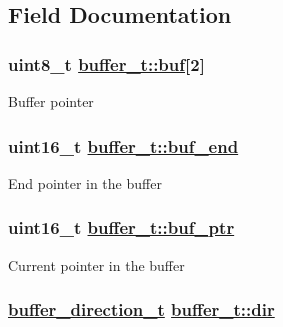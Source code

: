 \subsection{Field Documentation}
\hypertarget{structbuffer__t_ed0f8f327664a6eea8d419fd852a0b46}{
\subsubsection[buf]{\setlength{\rightskip}{0pt plus 5cm}uint8\_\-t \hyperlink{structbuffer__t_ed0f8f327664a6eea8d419fd852a0b46}{buffer\_\-t::buf}\mbox{[}2\mbox{]}}}
\label{structbuffer__t_ed0f8f327664a6eea8d419fd852a0b46}


Buffer pointer \hypertarget{structbuffer__t_93697fa152d62c9539dcd5b2f42b5d1d}{
\subsubsection[buf\_\-end]{\setlength{\rightskip}{0pt plus 5cm}uint16\_\-t \hyperlink{structbuffer__t_93697fa152d62c9539dcd5b2f42b5d1d}{buffer\_\-t::buf\_\-end}}}
\label{structbuffer__t_93697fa152d62c9539dcd5b2f42b5d1d}


End pointer in the buffer \hypertarget{structbuffer__t_435b821b8f73bc752e5ed8b0edec6a2d}{
\subsubsection[buf\_\-ptr]{\setlength{\rightskip}{0pt plus 5cm}uint16\_\-t \hyperlink{structbuffer__t_435b821b8f73bc752e5ed8b0edec6a2d}{buffer\_\-t::buf\_\-ptr}}}
\label{structbuffer__t_435b821b8f73bc752e5ed8b0edec6a2d}


Current pointer in the buffer \hypertarget{structbuffer__t_90c0669e859280525c9a16dc1d1a6153}{
\subsubsection[dir]{\setlength{\rightskip}{0pt plus 5cm}\hyperlink{buffer_8h_584321097d4e6c6a37198fbbb6d76c71}{buffer\_\-direction\_\-t} \hyperlink{structbuffer__t_90c0669e859280525c9a16dc1d1a6153}{buffer\_\-t::dir}}}
\label{structbuffer__t_90c0669e859280525c9a16dc1d1a6153}


